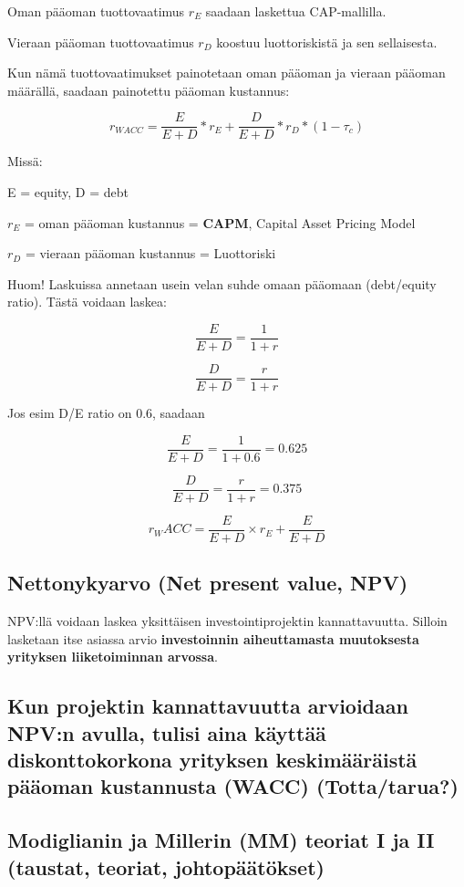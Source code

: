 \documentclass[a4paper]{article}
\begin{document}
Oman pääoman tuottovaatimus $r_E$ saadaan laskettua CAP-mallilla.

Vieraan pääoman tuottovaatimus $r_D$ koostuu luottoriskistä ja sen sellaisesta.

Kun nämä tuottovaatimukset painotetaan oman pääoman ja vieraan pääoman määrällä, saadaan painotettu pääoman kustannus:

\[
r_{WACC} = \frac{E}{E + D} * r_E + \frac{D}{E + D} * r_D * (1 - \tau_c)
\]

Missä: 

E = equity, D = debt

$r_E$ = oman pääoman kustannus = \textbf{CAPM}, Capital Asset Pricing Model

$r_D$ = vieraan pääoman kustannus = Luottoriski

Huom! Laskuissa annetaan usein velan suhde omaan pääomaan (debt/equity ratio). Tästä voidaan laskea:

\[
\frac{E}{E + D} = \frac{1}{1 +r}
\]

\[
\frac{D}{E + D} = \frac{r}{1 +r}
\]

Jos esim D/E ratio on 0.6, saadaan

\[
\frac{E}{E + D} = \frac{1}{1 + 0.6} = 0.625
\]

\[
\frac{D}{E + D} = \frac{r}{1 +r} = 0.375
\]

\[
    r_WACC = \frac{E}{E + D} \times r_E + \frac{E}{E + D}
\]

\subsection{Nettonykyarvo (Net present value, NPV)}

NPV:llä voidaan laskea yksittäisen investointiprojektin kannattavuutta. Silloin lasketaan itse asiassa arvio \textbf{investoinnin aiheuttamasta muutoksesta yrityksen liiketoiminnan arvossa}. 

\subsection{Kun projektin kannattavuutta arvioidaan NPV:n avulla, tulisi aina käyttää diskonttokorkona yrityksen keskimääräistä pääoman kustannusta (WACC) (Totta/tarua?)}

\subsection{Modiglianin ja Millerin (MM) teoriat I ja II (taustat, teoriat, johtopäätökset)}
\end{document}
